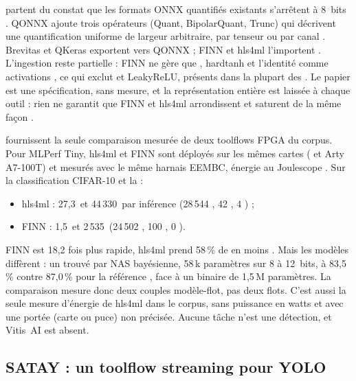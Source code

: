 \citet{arxiv-2206.07527-qonnx-representing-arbitrary-precision-quantized}\pp{} partent du
constat que les formats ONNX quantifiés existants s'arrêtent à 8~bits . QONNX
ajoute trois opérateurs (Quant, BipolarQuant, Trunc) qui décrivent une quantification
uniforme de largeur arbitraire, par tenseur ou par canal . Brevitas et
QKeras exportent vers QONNX ; FINN et hls4ml l'importent . L'ingestion reste
partielle : FINN ne gère que , hardtanh et l'identité comme activations , ce
qui exclut  et LeakyReLU, présents dans la plupart des  \deduit. Le papier est une
spécification, sans mesure, et la représentation entière est laissée à chaque outil
 : rien ne garantit que FINN et hls4ml arrondissent et saturent de la même façon
\deduit.

\citet{arxiv-2206.11791-open-source-fpga-ml-codesign}\pp{} fournissent la seule
comparaison mesurée de deux toolflows FPGA du corpus. Pour MLPerf Tiny, hls4ml et FINN sont
déployés sur les mêmes cartes ( et Arty A7-100T) et mesurés avec le même harnais
EEMBC, énergie au Joulescope . Sur la classification CIFAR-10 et la 
 :
\begin{itemize}
  \item hls4ml : 27,3\, et 44\,330\, par inférence (28\,544 , 42 , 4 ) ;
  \item FINN : 1,5\, et 2\,535\, (24\,502 , 100 , 0 ).
\end{itemize}
FINN est 18,2 fois plus rapide, hls4ml prend 58\,\% de  en moins . Mais les
modèles diffèrent : un  trouvé par NAS bayésienne, 58\,k paramètres sur 8 à 12~bits,
à 83,5\,\% contre 87,0\,\% pour la référence , face à un  binaire de 1,5\,M
paramètres. La comparaison mesure donc deux couples modèle-flot, pas deux flots. C'est aussi
la seule mesure d'énergie de hls4ml dans le corpus, sans puissance en watts et avec une
portée (carte ou puce) non précisée. Aucune tâche n'est une détection, et Vitis~AI est
absent.

\subsection{SATAY : un toolflow streaming pour YOLO}

